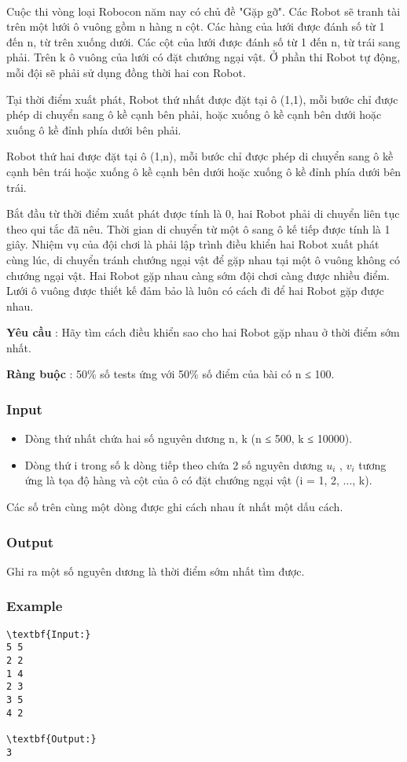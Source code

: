 

 

Cuộc thi vòng loại Robocon năm nay có chủ đề "Gặp gỡ". Các Robot sẽ tranh tài trên một lưới ô vuông gồm n hàng n cột. Các hàng của lưới được đánh số từ 1 đến n, từ trên xuống dưới. Các cột của lưới được đánh số từ 1 đến n, từ trái sang phải. Trên k ô vuông của lưới có đặt chướng ngại vật. Ở phần thi Robot tự động, mỗi đội sẽ phải sử dụng đồng thời hai con Robot.





Tại thời điểm xuất phát, Robot thứ nhất được đặt tại ô (1,1), mỗi bước chỉ được phép di chuyển sang ô kề cạnh bên phải, hoặc xuống ô kề cạnh bên dưới hoặc xuống ô kề đỉnh phía dưới bên phải.





Robot thứ hai được đặt tại ô (1,n), mỗi bước chỉ được phép di chuyển sang ô kề cạnh bên trái hoặc xuống ô kề cạnh bên dưới hoặc xuống ô kề đỉnh phía dưới bên trái.





Bắt đầu từ thời điểm xuất phát được tính là 0, hai Robot phải di chuyển liên tục theo qui tắc đã nêu. Thời gian di chuyển từ một ô sang ô kế tiếp được tính là 1 giây. Nhiệm vụ của đội chơi là phải lập trình điều khiển hai Robot xuất phát cùng lúc, di chuyển tránh chướng ngại vật để gặp nhau tại một ô vuông không có chướng ngại vật. Hai Robot gặp nhau càng sớm đội chơi càng được nhiều điểm. Lưới ô vuông được thiết kế đảm bảo là luôn có cách đi để hai Robot gặp được nhau.





\textbf{Yêu cầu } : Hãy tìm cách điều khiển sao cho hai Robot gặp nhau ở thời điểm sớm nhất.

\textbf{Ràng buộc } : 50\% số tests ứng với 50\% số điểm của bài có n ≤ 100.

\subsubsection{Input}
\begin{itemize}
	\item Dòng thứ nhất chứa hai số nguyên dương n, k (n ≤ 500, k ≤ 10000).
	\item Dòng thứ i trong số k dòng tiếp theo chứa 2 số nguyên dương $u_{i}$ , $v_{i}$ tương ứng là tọa độ hàng và cột của ô có đặt chướng ngại vật (i = 1, 2, ..., k).
\end{itemize}

Các số trên cùng một dòng được ghi cách nhau ít nhất một dấu cách.

\subsubsection{Output}

Ghi ra một số nguyên dương là thời điểm sớm nhất tìm được.

\subsubsection{Example}
\begin{verbatim}
\textbf{Input:}
5 5
2 2
1 4
2 3
3 5
4 2

\textbf{Output:}
3
\end{verbatim}
